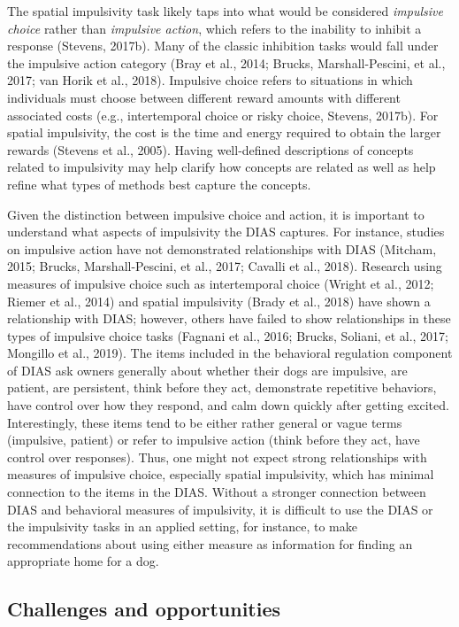 \documentclass[
  pub,floatsintext]{apa6}
\begin{document}
The spatial impulsivity task likely taps into what would be considered \emph{impulsive choice} rather than \emph{impulsive action}, which refers to the inability to inhibit a response (Stevens, 2017b). Many of the classic inhibition tasks would fall under the impulsive action category (Bray et al., 2014; Brucks, Marshall-Pescini, et al., 2017; van Horik et al., 2018). Impulsive choice refers to situations in which individuals must choose between different reward amounts with different associated costs (e.g., intertemporal choice or risky choice, Stevens, 2017b). For spatial impulsivity, the cost is the time and energy required to obtain the larger rewards (Stevens et al., 2005). Having well-defined descriptions of concepts related to impulsivity may help clarify how concepts are related as well as help refine what types of methods best capture the concepts.

Given the distinction between impulsive choice and action, it is important to understand what aspects of impulsivity the DIAS captures. For instance, studies on impulsive action have not demonstrated relationships with DIAS (Mitcham, 2015; Brucks, Marshall-Pescini, et al., 2017; Cavalli et al., 2018). Research using measures of impulsive choice such as intertemporal choice (Wright et al., 2012; Riemer et al., 2014) and spatial impulsivity (Brady et al., 2018) have shown a relationship with DIAS; however, others have failed to show relationships in these types of impulsive choice tasks (Fagnani et al., 2016; Brucks, Soliani, et al., 2017; Mongillo et al., 2019). The items included in the behavioral regulation component of DIAS ask owners generally about whether their dogs are impulsive, are patient, are persistent, think before they act, demonstrate repetitive behaviors, have control over how they respond, and calm down quickly after getting excited. Interestingly, these items tend to be either rather general or vague terms (impulsive, patient) or refer to impulsive action (think before they act, have control over responses). Thus, one might not expect strong relationships with measures of impulsive choice, especially spatial impulsivity, which has minimal connection to the items in the DIAS. Without a stronger connection between DIAS and behavioral measures of impulsivity, it is difficult to use the DIAS or the impulsivity tasks in an applied setting, for instance, to make recommendations about using either measure as information for finding an appropriate home for a dog.

\hypertarget{challenges-and-opportunities}{%
\subsection{Challenges and opportunities}\label{challenges-and-opportunities}}
\end{document}
